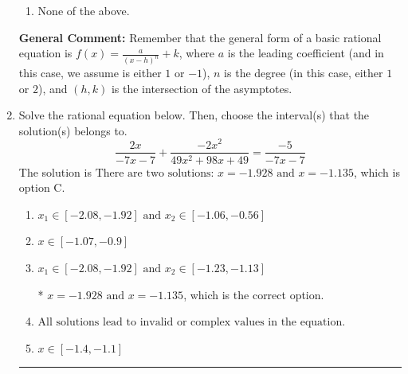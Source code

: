 \documentclass{extbook}[14pt]
\newcommand{\litem}[1]{\item #1

\rule{\textwidth}{0.4pt}}
\begin{document}
\begin{enumerate}
{\begin{enumerate}[label=\Alph*.]
\item None of the above.\end{enumerate}
\textbf{General Comment:} Remember that the general form of a basic rational equation is $ f(x) = \frac{a}{(x-h)^n} + k$, where $a$ is the leading coefficient (and in this case, we assume is either $1$ or $-1$), $n$ is the degree (in this case, either $1$ or $2$), and $(h, k)$ is the intersection of the asymptotes.
}
\litem{
Solve the rational equation below. Then, choose the interval(s) that the solution(s) belongs to.
\[ \frac{2x}{-7x -7} + \frac{-2x^{2}}{49x^{2} +98 x + 49} = \frac{-5}{-7x -7} \]The solution is \( \text{There are two solutions: } x = -1.928 \text{ and } x = -1.135 \), which is option C.\begin{enumerate}[label=\Alph*.]
\item \( x_1 \in [-2.08, -1.92] \text{ and } x_2 \in [-1.06,-0.56] \)


\item \( x \in [-1.07,-0.9] \)


\item \( x_1 \in [-2.08, -1.92] \text{ and } x_2 \in [-1.23,-1.13] \)

* $x = -1.928 \text{ and } x = -1.135$, which is the correct option.
\item \( \text{All solutions lead to invalid or complex values in the equation.} \)


\item \( x \in [-1.4,-1.1] \)


\end{enumerate}

}
\end{enumerate}
\end{document}
